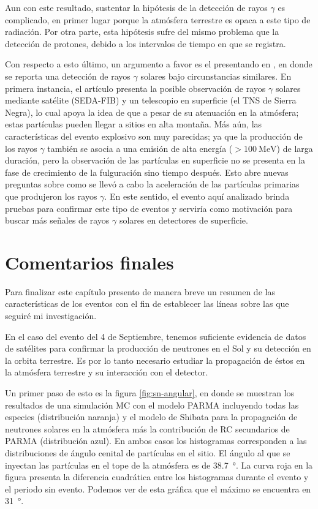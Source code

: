 Aun con este resultado, sustentar la hipótesis de la detección de rayos $\gamma$ es complicado, en primer lugar porque la atmósfera terrestre es opaca a este tipo de radiación. Por otra parte, esta hipótesis sufre del mismo problema que la detección de protones, debido a los intervalos de tiempo en que se registra.

Con respecto a esto último, un argumento a favor es el presentando en \cite{muraki20}, en donde se reporta una detección de rayos $\gamma$ solares bajo circunstancias similares. En primera instancia, el artículo presenta la posible observación de rayos $\gamma$ solares mediante satélite (SEDA-FIB) y un telescopio en superficie (el TNS de Sierra Negra), lo cual apoya la idea de que a pesar de su atenuación en la atmósfera; estas partículas pueden llegar a sitios en alta montaña. Más aún, las características del evento explosivo son muy parecidas; ya que la producción de los rayos $\gamma$ también se asocia a una emisión de alta energía ($>\SI{100}{\mega\electronvolt}$) de larga duración, pero la observación de las partículas en superficie no se presenta en la fase de crecimiento de la fulguración sino tiempo después. Esto abre nuevas preguntas sobre como se llevó a cabo la aceleración de las partículas primarias que produjeron los rayos $\gamma$. En este sentido, el evento aquí analizado brinda pruebas para confirmar este tipo de eventos y serviría como motivación para buscar más señales de rayos $\gamma$ solares en detectores de superficie.

\section{Comentarios finales}

Para finalizar este capítulo presento de manera breve un resumen de las características de los eventos con el fin de establecer las líneas sobre las que seguiré mi investigación.

En el caso del evento del \num{4} de Septiembre, tenemos suficiente evidencia de datos de satélites para confirmar la producción de neutrones en el Sol y su detección en la orbita terrestre. Es por lo tanto necesario estudiar la propagación de éstos en la atmósfera terrestre y su interacción con el detector.

Un primer paso de esto es la figura \ref{fig:sn-angular}, en donde se muestran los resultados de una simulación MC con el modelo PARMA incluyendo todas las especies (distribución naranja) y el modelo de Shibata para la propagación de neutrones solares en la atmósfera más la contribución de RC secundarios de PARMA (distribución azul). En ambos casos los histogramas corresponden a las distribuciones de ángulo cenital de partículas en el sitio. El ángulo al que se inyectan las partículas en el tope de la atmósfera es de \SI{38.7}{\degree}. La curva roja en la figura presenta la diferencia cuadrática entre los histogramas durante el evento y el periodo sin evento. Podemos ver de esta gráfica que el máximo se encuentra en  \SI{31}{\degree}.

